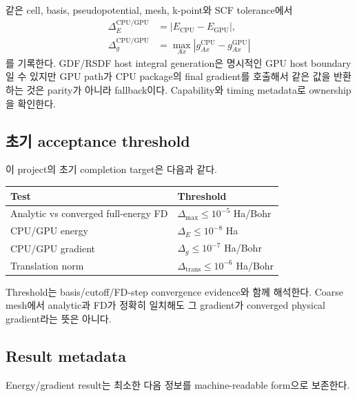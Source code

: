 같은 cell, basis, pseudopotential, mesh, k-point와 SCF tolerance에서
\begin{align}
  \Delta_E^{\mathrm{CPU/GPU}}
  &=|E_{\mathrm{CPU}}-E_{\mathrm{GPU}}|,
  \label{eq:cpu-gpu-energy-error}\\
  \Delta_g^{\mathrm{CPU/GPU}}
  &=\max_{Ax}|g_{Ax}^{\mathrm{CPU}}-g_{Ax}^{\mathrm{GPU}}|
  \label{eq:cpu-gpu-gradient-error}
\end{align}
를 기록한다. GDF/RSDF host integral generation은 명시적인 GPU host boundary일 수 있지만
GPU path가 CPU package의 final gradient를 호출해서 같은 값을 반환하는 것은 parity가
아니라 fallback이다. Capability와 timing metadata로 ownership을 확인한다.

\subsection{초기 acceptance threshold}

이 project의 초기 completion target은 다음과 같다.

\begin{center}
\begin{tabular}{ll}
\toprule
Test & Threshold \\
\midrule
Analytic vs converged full-energy FD & $\Delta_{\max}\le10^{-5}$ Ha/Bohr \\
CPU/GPU energy & $\Delta_E\le10^{-8}$ Ha \\
CPU/GPU gradient & $\Delta_g\le10^{-7}$ Ha/Bohr \\
Translation norm & $\Delta_{\mathrm{trans}}\le10^{-6}$ Ha/Bohr \\
\bottomrule
\end{tabular}
\end{center}

Threshold는 basis/cutoff/FD-step convergence evidence와 함께 해석한다. Coarse mesh에서
analytic과 FD가 정확히 일치해도 그 gradient가 converged physical gradient라는 뜻은
아니다.

\subsection{Result metadata}

Energy/gradient result는 최소한 다음 정보를 machine-readable form으로 보존한다.

